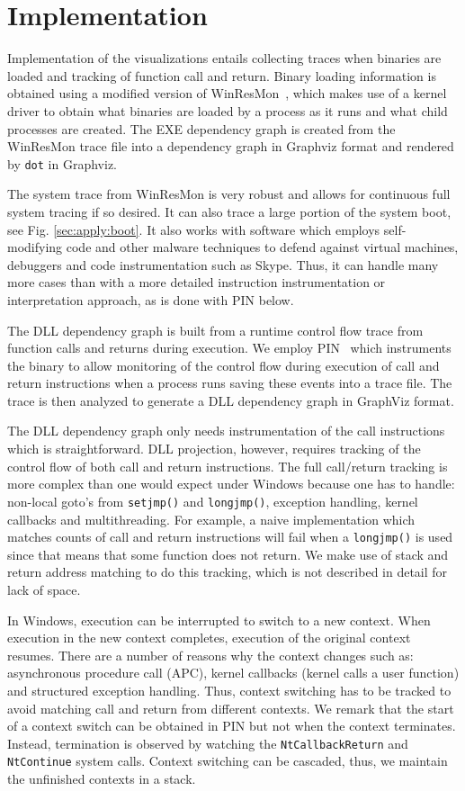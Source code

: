 \section{Implementation}

Implementation of the visualizations entails collecting tra\-ces when
binaries are loaded and tracking of function call and return.
Binary loading information is obtained using
a modified version of WinResMon~\cite{winresmon},
which makes use of a kernel driver to obtain
what binaries are loaded by a process as it runs and
what child processes are created.
The EXE dependency graph is created from
the WinResMon trace file into a dependency graph in
Graphviz \cite{graphviz} format and rendered by {\tt dot} in Graphviz.

The system trace from WinResMon is very robust and allows for continuous
full system tracing if so desired.
It can also trace a large portion of the system boot,
see Fig. \ref{sec:apply:boot}.
It also works with software which employs self-modifying
code and other malware techniques to defend against virtual machines,
debuggers and code instrumentation such as Skype.
Thus, it can handle many more cases than with a more detailed
instruction instrumentation or interpretation approach, as is done
with PIN below.

The DLL dependency graph is built from a runtime contr\-ol flow trace from
function calls and returns during execution.
We employ PIN~\cite{pin} which instruments the binary to allow monitoring
of the control flow during execution of call and return instructions
when a process runs saving these events into a trace file.
The trace is then analyzed to generate a DLL dependency graph in
GraphViz format.

The DLL dependency graph only needs instrumentation of the call instructions
which is straightforward.
DLL projection, however, requires tracking of the control flow of both
call and return instructions.
The full call/return tracking is more complex than one would expect
under Windows because one has to handle:
non-local goto's from {\tt setjmp()} and {\tt longjmp()}, exception handling,
kernel callbacks and multithreading.
For example, a naive implementation which matches counts of call and
return instructions will fail when a {\tt longjmp()} is used
since that means that some function does not return.
We make use of stack and return address matching to do this
tracking, which is not described in detail for lack of space.

In Windows, execution can be interrupted to switch to a new context.
When execution in the new context completes, execution of the original
context resumes.
There are a number of reasons why the context changes
such as: asynchronous procedure call (APC), kernel callbacks
(kernel calls a user function) and structured exception handling.
Thus, context switching has to be tracked to avoid matching
call and return from different contexts.
We remark that the start of a context switch can be obtained in PIN but
not when the context terminates.
Instead, termination is observed by watching the {\tt NtCallbackReturn}
and {\tt NtContinue} system calls.
Context switching can be cascaded, thus, we maintain the unfinished
contexts in a stack.

